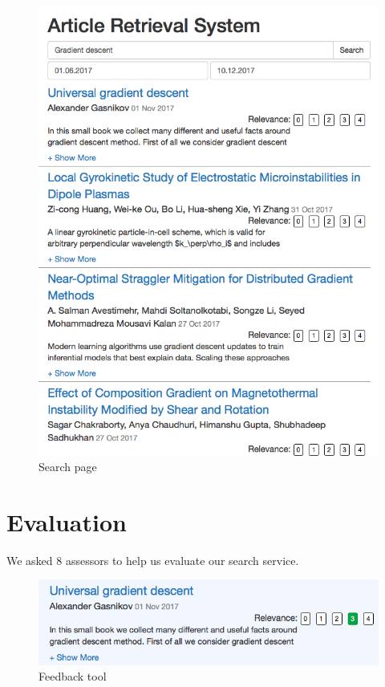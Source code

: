 \begin{figure}
  \includegraphics[width=\linewidth]{screenshot_1.png}
  \caption{Search page}
  \label{fig:search_page}
\end{figure}

\section{Evaluation}

We asked 8 assessors to help us evaluate our search service. 


\begin{figure}
  \includegraphics[width=\linewidth]{screenshot_2.png}
  \caption{Feedback tool}
  \label{fig:search_page}
\end{figure}

